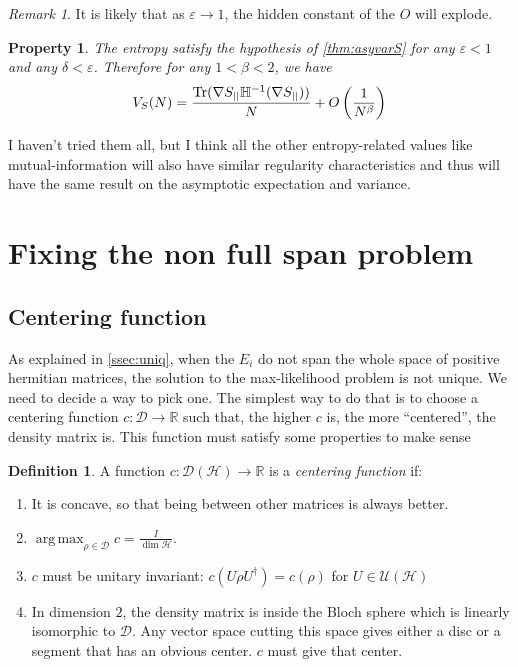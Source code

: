 \documentclass[10pt,a4paper]{report}
\theoremstyle{plain}
\newtheorem{prop}[thm]{Property}
\theoremstyle{definition}
\newtheorem{defn}{Definition}[chapter]
\theoremstyle{remark}
\newtheorem*{rem}{Remark}
\newcommand{\R}{\ensuremath{\mathbb{R}}}
\DeclareMathOperator{\Tr}{Tr}
\DeclareMathOperator{\argmax}{arg\,max}
\begin{document}
\begin{rem}
It is likely that as $\varepsilon \to 1$, the hidden constant
of the $O$ will explode.
\end{rem}

\begin{prop}
  The entropy satisfy the hypothesis of \cref{thm:asyvarS} for any $\varepsilon
  < 1$ and any $\delta < \varepsilon$. Therefore for any $1 < \beta < 2$, we have
  \[V_S(N) = \frac{\Tr(\nabla S\pr \mathbb H\inv(\nabla S\pr))}N
    +O\left(\frac 1 {N^\beta}\right)\]
\end{prop}



I haven't tried them all, but I think all the other entropy-related values like
mutual-information will also have similar regularity characteristics and thus will
have the same result on the asymptotic expectation and variance.



\section{Fixing the non full span problem}\label{sec:fixspan}

\subsection{Centering function}

As explained in \cref{ssec:uniq}, when the $E_i$ do not span the whole space of
positive hermitian matrices, the solution to the max-likelihood problem is not
unique. We need to decide a way to pick one. The simplest way to do that is to
choose a centering function $c : \mathcal{D} \to \R$ such that, the higher $c$
is, the more ``centered'', the density matrix is. This function must satisfy
some properties to make sense

\begin{defn}
  A function $c : \mathcal{D}(\mathcal{H}) \to \R$ is a \emph{centering function} if:

  \begin{enumerate}
  \item It is concave, so that being between other matrices is always better.
  \item $\displaystyle \argmax_{\rho \in \mathcal{D}} c = \frac I{\dim
      \mathcal{H}}$.
  \item $c$ must be unitary invariant: $c(U\rho U^\dagger) = c(\rho)$ for $U \in \mathcal{U}(\mathcal{H})$
  \item In dimension $2$, the density matrix is inside the Bloch sphere which is
    linearly isomorphic to $\mathcal{D}$. Any vector space cutting this space
    gives either a disc or a segment that has an obvious center. $c$ must give
    that center.
  \end{enumerate}
\end{defn}
\end{document}
